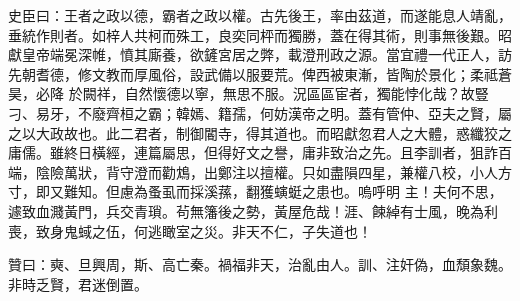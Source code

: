 \begin{pinyinscope}
 史臣曰：王者之政以德，霸者之政以權。古先後王，率由茲道，而遂能息人靖亂，垂統作則者。如梓人共柯而殊工，良奕同枰而獨勝，蓋在得其術，則事無後艱。昭獻皇帝端冕深帷，憤其廝養，欲鏟宮居之弊，載澄刑政之源。當宜禮一代正人，訪先朝耆德，修文教而厚風俗，設武備以服要荒。俾西被東漸，皆陶於景化；柔祗蒼昊，必降
 於闕祥，自然懷德以寧，無思不服。況區區宦者，獨能悖化哉？故豎刁、易牙，不廢齊桓之霸；韓嫣、籍孺，何妨漢帝之明。蓋有管仲、亞夫之賢，屬之以大政故也。此二君者，制御閽寺，得其道也。而昭獻忽君人之大體，惑纖狡之庸儒。雖終日橫經，連篇屬思，但得好文之譽，庸非致治之先。且李訓者，狙詐百端，陰險萬狀，背守澄而勸鴆，出鄭注以擅權。只如盡隕四星，兼權八校，小人方寸，即又難知。但慮為蚤虱而採溪蓀，翻獲螾蜓之患也。嗚呼明
 主！夫何不思，遽致血濺黃門，兵交青瑣。茍無籓後之勢，黃屋危哉！涯、餗綽有士風，晚為利喪，致身鬼蜮之伍，何逃瞰室之災。非天不仁，子失道也！



 贊曰：奭、旦興周，斯、高亡秦。禍福非天，治亂由人。訓、注奸偽，血頹象魏。非時乏賢，君迷倒置。



\end{pinyinscope}